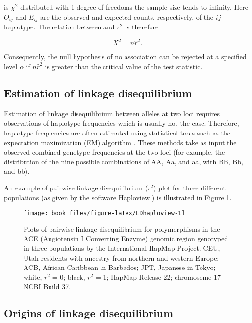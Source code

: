 \documentclass[]{book}
\begin{document}
is \(\chi^2\) distributed with 1 degree of freedoms the sample size tends
to infinity. Here \(O_{ij}\) and \(E_{ij}\) are the observed and expected
counts, respectively, of the \(ij\) haplotype. The relation between and
\(r^2\) is therefore

\[X^2 = n\hat{r}^2.\]

Consequently, the null hypothesis of no association can be rejected at a
specified level \(\alpha\) if \(n\hat{r}^2\) is greater than the critical
value of the test statistic.

\hypertarget{estimation-of-linkage-disequilibrium}{%
\subsection{Estimation of linkage disequilibrium}\label{estimation-of-linkage-disequilibrium}}

Estimation of linkage disequilibrium between alleles at two loci
requires observations of haplotype frequencies which is usually not the
case. Therefore, haplotype frequencies are often estimated using
statistical tools such as the expectation maximization (EM) algorithm
\citep{weir1990genetic}. These methods take as input the observed combined
genotype frequencies at the two loci (for example, the distribution of
the nine possible combinations of AA, Aa, and aa, with BB, Bb, and bb).

An example of pairwise linkage disequilibrium (\(r^2\)) plot for three
different populations (as given by the software Haploview
\citep{barrett2004haploview}) is illustrated in Figure \ref{fig:LDhaploview}.



\begin{figure}

{\centering \texttt{[image: book\_files/figure-latex/LDhaploview-1]} 

}

\caption{Plots of pairwise linkage disequilibrium for polymorphisms in the ACE (Angiotensin I Converting Enzyme) genomic region genotyped in three populations by the International HapMap Project. CEU, Utah residents with ancestry from northern and western Europe; ACB, African Caribbean in Barbados; JPT, Japanese in Tokyo; white, \(r^2\) = 0; black, \(r^2\) = 1; HapMap Release 22; chromosome 17 NCBI Build 37.}\label{fig:LDhaploview}
\end{figure}

\hypertarget{origins-of-linkage-disequilibrium}{%
\subsection{Origins of linkage disequilibrium}\label{origins-of-linkage-disequilibrium}}
\end{document}
